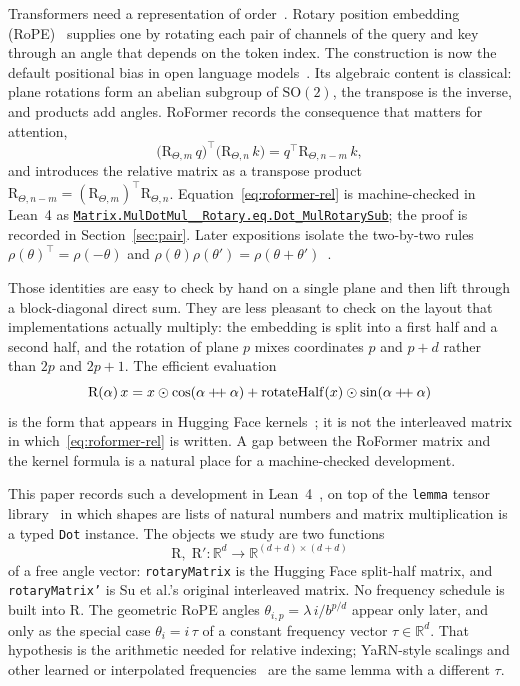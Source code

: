 \documentclass[11pt,a4paper]{article}
\newcommand{\lmod}[1]{\href{http://www.lemma.cn/lean/?module=#1}{\nolinkurl{#1}}}
\newcommand{\R}{\mathbb{R}}
\newcommand{\rot}{\mathrm{R}}
\newcommand{\concat}{\mathbin{+\mkern-4mu+}}
\begin{document}
Transformers need a representation of order~\cite{vaswani2017attention}.
Rotary position embedding (RoPE)~\cite{su2021roformer,su2024roformer} supplies one by rotating each pair of channels of the query and key through an angle that depends on the token index.
The construction is now the default positional bias in open language models~\cite{touvron2023llama}.
Its algebraic content is classical: plane rotations form an abelian subgroup of \(\mathrm{SO}(2)\), the transpose is the inverse, and products add angles.
RoFormer records the consequence that matters for attention,
\begin{equation}
  \label{eq:roformer-rel}
  \bigl(\rot_{\Theta,m}\,q\bigr)^\top\bigl(\rot_{\Theta,n}\,k\bigr)
  = q^\top \rot_{\Theta,n-m}\,k,
\end{equation}
and introduces the relative matrix as a transpose product
\(\rot_{\Theta,n-m}=(\rot_{\Theta,m})^\top\rot_{\Theta,n}\).
Equation~\eqref{eq:roformer-rel} is machine-checked in Lean~4 as
\lmod{Matrix.MulDotMul__Rotary.eq.Dot_MulRotarySub};
the proof is recorded in Section~\ref{sec:pair}.
Later expositions isolate the two-by-two rules \(\rho(\theta)^\top=\rho(-\theta)\) and \(\rho(\theta)\rho(\theta')=\rho(\theta+\theta')\)~\cite{barbero2025round}.

Those identities are easy to check by hand on a single plane and then lift through a block-diagonal direct sum.
They are less pleasant to check on the layout that implementations actually multiply: the embedding is split into a first half and a second half, and the rotation of plane \(p\) mixes coordinates \(p\) and \(p+d\) rather than \(2p\) and \(2p+1\).
The efficient evaluation
\begin{equation}
  \label{eq:impl-intro}
  \rot(\alpha)\,x
  = x \odot \cos(\alpha\concat\alpha)
  + \mathrm{rotateHalf}(x)\odot\sin(\alpha\concat\alpha)
\end{equation}
is the form that appears in Hugging Face kernels~\cite{huggingface_rope_utils,touvron2023llama}; it is not the interleaved matrix in which~\eqref{eq:roformer-rel} is written.
A gap between the RoFormer matrix and the kernel formula is a natural place for a machine-checked development.

This paper records such a development in Lean~4~\cite{moura2021lean4}, on top of the \texttt{lemma} tensor library~\cite{lemma_repo} in which shapes are lists of natural numbers and matrix multiplication is a typed \texttt{Dot} instance.
The objects we study are two functions
\[
  \rot,\;\rot' : \R^d \to \R^{(d+d)\times(d+d)}
\]
of a free angle vector:
\texttt{rotaryMatrix} is the Hugging Face split-half matrix, and
\texttt{rotaryMatrix'} is Su et al.'s original interleaved matrix.
No frequency schedule is built into \(\rot\).
The geometric RoPE angles \(\theta_{i,p}=\lambda\,i/b^{p/d}\) appear only later, and only as the special case \(\theta_i=i\,\tau\) of a constant frequency vector \(\tau\in\R^d\).
That hypothesis is the arithmetic needed for relative indexing; YaRN-style scalings and other learned or interpolated frequencies~\cite{peng2023yarn} are the same lemma with a different \(\tau\).
\end{document}
